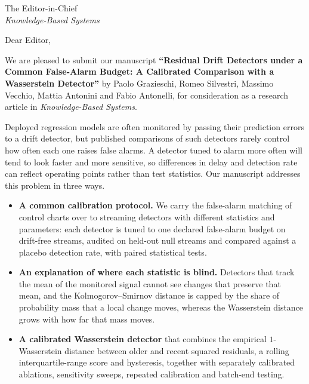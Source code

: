 \documentclass[11pt,a4paper]{letter}
\begin{document}
\newlength{\sigwidth}
\settowidth{\sigwidth}{OpenIoT Research Unit, Fondazione Bruno Kessler}
\setlength{\longindentation}{\dimexpr\textwidth-\sigwidth\relax}
\setlength{\indentedwidth}{\sigwidth}
\begin{letter}{The Editor-in-Chief\\
\textit{Knowledge-Based Systems}}

\opening{Dear Editor,}

We are pleased to submit our manuscript \textbf{``Residual Drift Detectors under a Common False-Alarm Budget: A Calibrated Comparison with a Wasserstein Detector''} by Paolo Grazieschi, Romeo Silvestri, Massimo Vecchio, Mattia Antonini and Fabio Antonelli, for consideration as a research article in \textit{Knowledge-Based Systems}.

Deployed regression models are often monitored by passing their prediction errors to a drift detector, but published comparisons of such detectors rarely control how often each one raises false alarms. A detector tuned to alarm more often will tend to look faster and more sensitive, so differences in delay and detection rate can reflect operating points rather than test statistics. Our manuscript addresses this problem in three ways.

\begin{itemize}
\item \textbf{A common calibration protocol.} We carry the false-alarm matching of control charts over to streaming detectors with different statistics and parameters: each detector is tuned to one declared false-alarm budget on drift-free streams, audited on held-out null streams and compared against a placebo detection rate, with paired statistical tests.
\item \textbf{An explanation of where each statistic is blind.} Detectors that track the mean of the monitored signal cannot see changes that preserve that mean, and the Kolmogorov--Smirnov distance is capped by the share of probability mass that a local change moves, whereas the Wasserstein distance grows with how far that mass moves.
\item \textbf{A calibrated Wasserstein detector} that combines the empirical $1$-Wasserstein distance between older and recent squared residuals, a rolling interquartile-range score and hysteresis, together with separately calibrated ablations, sensitivity sweeps, repeated calibration and batch-end testing.
\end{itemize}


\end{letter}
\end{document}
